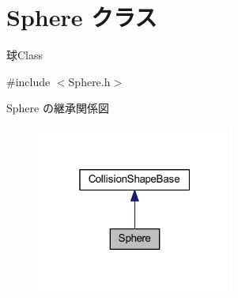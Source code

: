 \hypertarget{class_sphere}{}\section{Sphere クラス}
\label{class_sphere}


球\+Class  




{\ttfamily \#include $<$Sphere.\+h$>$}



Sphere の継承関係図\nopagebreak
\begin{figure}[H]
\begin{center}
\leavevmode
\includegraphics[width=184pt]{class_sphere__inherit__graph}
\end{center}
\end{figure}
